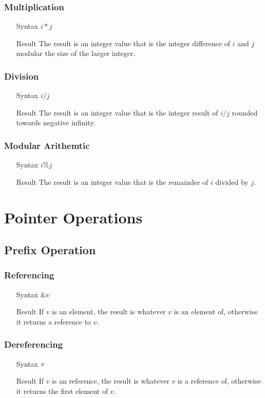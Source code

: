 \subsubsection{Multiplication}
\begin{itemize}
\item[Syntax] $i * j$
\item[Result] The result is an integer value that is the integer difference of $i$ and $j$ modular the size of the larger integer.
\end{itemize}
\subsubsection{Division}
\begin{itemize}
\item[Syntax] $i / j$
\item[Result] The result is an integer value that is the integer result of $i / j$ rounded towards negative infinity.
\end{itemize}
\subsubsection{Modular Arithemtic}
\begin{itemize}
\item[Syntax] $i \% j$
\item[Result] The result is an integer value that is the remainder of $i$ divided by $j$.
\end{itemize}
\section{Pointer Operations}
\subsection{Prefix Operation}
\subsubsection{Referencing}
\begin{itemize}
\item[Syntax] $\&v$
\item[Result] If $v$ is an element, the result is whatever $v$ is an element of, otherwise it returns a reference to $v$.
\end{itemize}
\subsubsection{Dereferencing}
\begin{itemize}
\item[Syntax] $\*v$
\item[Result] If $v$ is an reference, the result is whatever $v$ is a reference of, otherwise it returns the first element of $v$.
\end{itemize}
